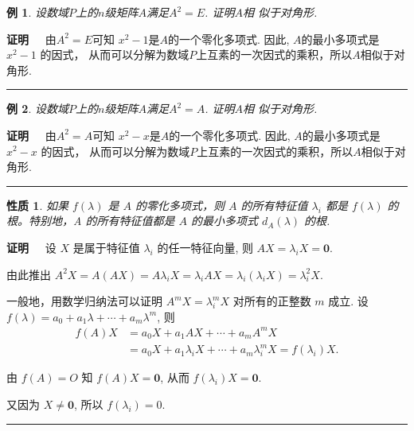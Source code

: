 \documentclass[13pt]{beamer}
\newtheorem{exa}{例}
\newtheorem*{prop}{性质}
\def\qed{\nopagebreak\hfill{\rule{4pt}{7pt}}\medbreak}
\def\pf{{\bf 证明~~ }}
\def\0{\mathbf{0}}
\begin{document}
\begin{frame}
\begin{exa}
设数域$P$上的$n$级矩阵$A$满足$A^2=E$. 证明$A$相
似于对角形. 
\end{exa} 
\pf 由$A^2=E$可知 $x^2-1$是$A$的一个零化多项式. 
因此, $A$的最小多项式是$x^2-1$ 的因式，
从而可以分解为数域$P$上互素的一次因式的乘积，所以$A$相似于对角形. 
\qed

\begin{exa}
	设数域$P$上的$n$级矩阵$A$满足$A^{2}=A$. 证明$A$相
	似于对角形. 
\end{exa} 
\pf 
由$A^{2}=A$可知 $x^2-x$是$A$的一个零化多项式. 
因此, $A$的最小多项式是$x^2-x$ 的因式，
从而可以分解为数域$P$上互素的一次因式的乘积，所以$A$相似于对角形. 
\qed
\end{frame}


\begin{frame}

\begin{prop}
如果 $f(\lambda)$ 是 $A$ 的零化多项式，则 $A$ 的所有特征值 $\lambda_{i}$ 都是
$f(\lambda)$ 的根。特别地，A 的所有特征值都是 $A$ 的最小多项式 $d_{A}(\lambda)$ 的根.
\end{prop}

\pf 设 $X$ 是属于特征值 $\lambda_{i}$ 的任一特征向量, 则 $A X=\lambda_{i} X=\0 .$ 

由此推出
$
A^{2} X=A(A X)=A \lambda_{i} X=\lambda_{i} A X=\lambda_{i}\left(\lambda_{i} X\right)=\lambda_{i}^{2} X.
$

一般地，用数学归纳法可以证明 $A^{m} X=\lambda_{i}^{m} X$ 对所有的正整数 $m$ 成立.
设
$
f(\lambda)=a_{0}+a_{1} \lambda+\cdots+a_{m} \lambda^{m}$,  { 则 } 
\begin{align*}
f({A}) {X} &=a_{0} {X}+a_{1} A {X}+\cdots+a_{m} {A}^{m} {X} \\
&=a_{0} {X}+a_{1} \lambda_{i} {X}+\cdots+a_{m} \lambda_{i}^{m} {X}=f\left(\lambda_{i}\right) X.
\end{align*}

由  $f({A})={O}$  知 
$f(A) X=\0$, 
 从而  $f\left(\lambda_{i}\right) X=\0$.
 
又因为 $X \neq \0$,  { 所以 } $f\left(\lambda_{i}\right)= 0$.
 \qed
\end{frame}
\end{document}
